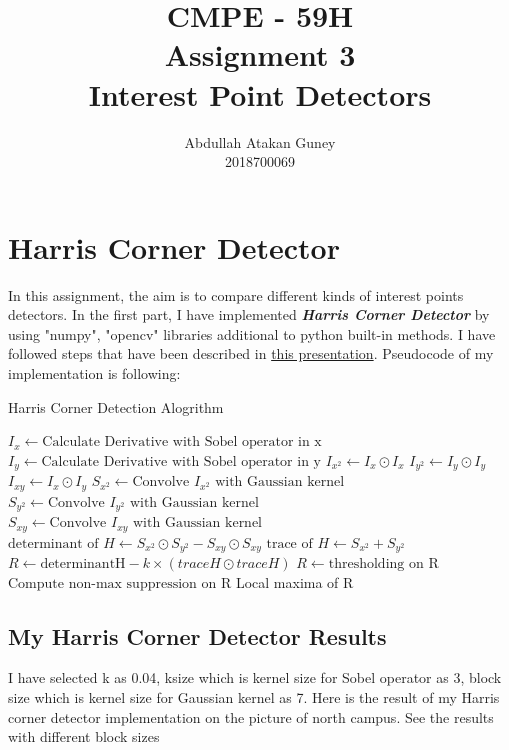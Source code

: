 \documentclass[12pt]{article}
\title{CMPE - 59H \\ Assignment 3 \\ Interest Point Detectors}
\author{Abdullah Atakan Guney \\ 2018700069}
\begin{document}
 
 
 
\maketitle

\newpage

\tableofcontents

\newpage

\section{Harris Corner Detector}
In this assignment, the aim is to compare different kinds of interest points detectors. In the first part, I have implemented \textbf{\textit{Harris Corner Detector}} by using "numpy", "opencv" libraries additional to python built-in methods. I have followed steps that have been described in \href{http://www.cse.psu.edu/~rtc12/CSE486/lecture06.pdf}{this presentation}.  Pseudocode of my implementation is following:

\begin{algorithm}
\caption{Harris Corner Detection Alogrithm}\label{}
\begin{algorithmic}[1]
\State $I_{x} \gets \text{Calculate Derivative with Sobel operator in x}$
\State $I_{y} \gets \text{Calculate Derivative with Sobel operator in y}$
\State $I_{x^2} \gets I_x \odot I_x$
\State $I_{y^2} \gets I_y \odot I_y$
\State $I_{xy} \gets I_x \odot I_y$
\State $S_{x^2} \gets \text{Convolve } I_{x^2} \text{ with Gaussian kernel}$
\State $S_{y^2} \gets \text{Convolve } I_{y^2} \text{ with Gaussian kernel}$
\State $S_{xy} \gets \text{Convolve } I_{xy} \text{ with Gaussian kernel}$
\State $\text{determinant of} \textit{ H} \gets S_{x^2} \odot S_{y^2} - S_{xy} \odot S_{xy}$
\State $\text{trace of } \textit{H} \gets S_{x^2} + S_{y^2}$
\State $R \gets \text{determinantH} - k \times (traceH \odot traceH)$
\State $R \gets \text{thresholding on R}$
\State $\text{Compute non-max suppression on R}$ 
\State \Return Local maxima of R
\EndProcedure
\end{algorithmic}
\end{algorithm}

\subsection{My Harris Corner Detector Results}
I have selected k as 0.04, ksize which is kernel size for Sobel operator as 3, block size which is kernel size for Gaussian kernel as 7.
Here is the result of my Harris corner detector implementation on the picture of north campus. See the results with different block sizes
\end{document}
